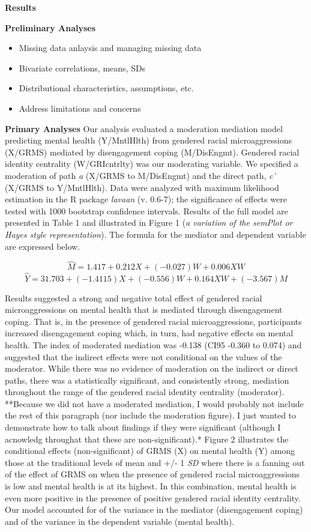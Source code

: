 \documentclass[
  11pt,
]{book}
\providecommand{\tightlist}{%
  \setlength{\itemsep}{0pt}\setlength{\parskip}{0pt}}
\begin{document}
\textbf{Results}

\textbf{Preliminary Analyses}

\begin{itemize}
\tightlist
\item
  Missing data anlaysis and managing missing data
\item
  Bivariate correlations, means, SDs
\item
  Distributional characteristics, assumptions, etc.
\item
  Address limitations and concerns
\end{itemize}

\textbf{Primary Analyses} Our analysis evaluated a moderation mediation model predicting mental health (Y/MntlHlth) from gendered racial microaggressions (X/GRMS) mediated by disengagement coping (M/DisEngmt). Gendered racial identity centrality (W/GRIcntrlty) was our moderating variable. We specified a moderation of path \emph{a} (X/GRMS to M/DisEngmt) and the direct path, \emph{c'} (X/GRMS to Y/MntlHlth). Data were analyzed with maximum likelihood estimation in the R package \emph{lavaan} (v. 0.6-7); the significance of effects were tested with 1000 bootstrap confidence intervals. Results of the full model are presented in Table 1 and illustrated in Figure 1 (\emph{a variation of the semPlot or Hayes style representation}). The formula for the mediator and dependent variable are expressed below.

\[\hat{M} = 1.417 + 0.212X + (-0.027) W + 0.006XW\] \[\hat{Y} = 31.703 + (-1.4115)X + (-0.556)W + 0.164XW + (-3.567)M\]

Results suggested a strong and negative total effect of gendered racial microaggressions on mental health that is mediated through disengagement coping. That is, in the presence of gendered racial microaggressions, participants increased disengagement coping which, in turn, had negative effects on mental health. The index of moderated mediation was -0.138 (CI95 -0.360 to 0.074) and suggested that the indirect effects were not conditional on the values of the moderator. While there was no evidence of moderation on the indirect or direct paths, there was a statistically significant, and consistently strong, mediation throughout the range of the gendered racial identity centrality (moderator). **Because we did not have a moderated mediation, I would probably not include the rest of this paragraph (nor include the moderation figure). I just wanted to demonstrate how to talk about findings if they were significant (although I acnowledg throughat that these are non-significant).* Figure 2 illustrates the conditional effects (non-significant) of GRMS (X) on mental health (Y) among those at the traditional levels of mean and +/- 1 \emph{SD} where there is a fanning out of the effect of GRMS on when the presence of gendered racial microaggressions is low and mental health is at its highest. In this combination, mental health is even more positive in the presence of positive gendered racial identity centrality. Our model accounted for of the variance in the mediator (disengagement coping) and of the variance in the dependent variable (mental health).
\end{document}
